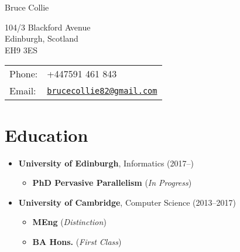\documentclass[letterpaper]{article}
\def\name{Bruce Collie}
\begin{document}
{\huge \name}


\vspace{0.25in}

\begin{minipage}{0.45\linewidth}
  104/3 Blackford Avenue \\
  Edinburgh, Scotland \\
  EH9 3ES
\end{minipage}
\begin{minipage}{0.45\linewidth}
  \begin{tabular}{ll}
    Phone: & +447591 461 843 \\
    Email: & \href{mailto:brucecollie82@gmail.com}{\tt brucecollie82@gmail.com}
  \end{tabular}
\end{minipage}

\section*{Education}

\begin{itemize}
  \item \textbf{University of Edinburgh}, Informatics (2017--)
    \begin{itemize}
      \item \textbf{PhD Pervasive Parallelism} (\emph{In Progress})
    \end{itemize}
  \item \textbf{University of Cambridge}, Computer Science (2013--2017)
        \begin{itemize}
            \item \textbf{MEng} (\emph{Distinction})
            \item \textbf{BA Hons.} (\emph{First Class})
        \end{itemize}
\end{itemize}
\end{document}
